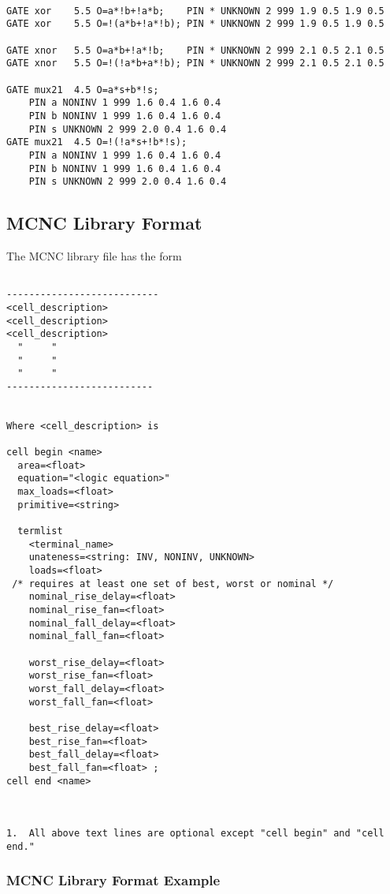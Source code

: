 {\begin{pespace}
\begin{verbatim}

GATE xor	5.5	O=a*!b+!a*b;	PIN * UNKNOWN 2 999 1.9 0.5 1.9 0.5
GATE xor	5.5	O=!(a*b+!a*!b);	PIN * UNKNOWN 2 999 1.9 0.5 1.9 0.5

GATE xnor	5.5	O=a*b+!a*!b;	PIN * UNKNOWN 2 999 2.1 0.5 2.1 0.5
GATE xnor	5.5	O=!(!a*b+a*!b);	PIN * UNKNOWN 2 999 2.1 0.5 2.1 0.5

GATE mux21	4.5	O=a*s+b*!s;
    PIN a NONINV 1 999 1.6 0.4 1.6 0.4
    PIN b NONINV 1 999 1.6 0.4 1.6 0.4
    PIN s UNKNOWN 2 999 2.0 0.4 1.6 0.4
GATE mux21	4.5	O=!(!a*s+!b*!s);
    PIN a NONINV 1 999 1.6 0.4 1.6 0.4
    PIN b NONINV 1 999 1.6 0.4 1.6 0.4
    PIN s UNKNOWN 2 999 2.0 0.4 1.6 0.4
\end{verbatim}



\newpage
\subsection{MCNC Library Format}


The MCNC library file has the form 


\begin{verbatim}

---------------------------
<cell_description>
<cell_description>
<cell_description>
  "     "
  "     "
  "     "
--------------------------


Where <cell_description> is 

cell begin <name>
  area=<float>
  equation="<logic equation>" 
  max_loads=<float>
  primitive=<string>

  termlist
    <terminal_name>
    unateness=<string: INV, NONINV, UNKNOWN>
    loads=<float> 
 /* requires at least one set of best, worst or nominal */
    nominal_rise_delay=<float>
    nominal_rise_fan=<float>
    nominal_fall_delay=<float>
    nominal_fall_fan=<float> 

    worst_rise_delay=<float>
    worst_rise_fan=<float>          
    worst_fall_delay=<float>
    worst_fall_fan=<float> 

    best_rise_delay=<float>
    best_rise_fan=<float>
    best_fall_delay=<float>
    best_fall_fan=<float> ;
cell end <name>



1.  All above text lines are optional except "cell begin" and "cell end."

\end{verbatim}


\newpage
\subsubsection{MCNC Library Format Example}



\end{pespace}}
